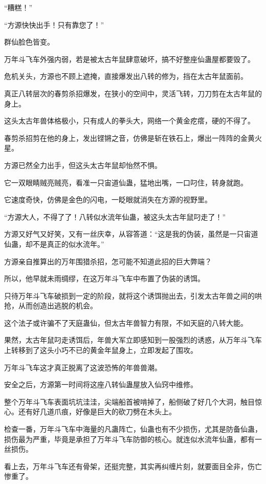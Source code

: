 \begin{this_body}
“糟糕！”

“方源快快出手！只有靠您了！”

群仙脸色皆变。

万年斗飞车外强内弱，若是被太古年鼠肆意破坏，搞不好整座仙蛊屋都要毁了。

危机关头，方源也不顾上遮掩，直接爆发出八转的修为，挡在太古年鼠面前。

真正八转层次的春剪杀招爆发，在狭小的空间中，灵活飞转，刀刀剪在太古年鼠的身上。

这头太古年兽体格极小，只有成人的拳头大，网络一个黄金疙瘩，硬的不得了。

春剪杀招剪在他的身上，发出铿锵之音，仿佛是斩在铁石上，爆出一阵阵的金黄火星。

方源已然全力出手，但这头太古年鼠却怡然不惧。

它一双眼睛贼亮贼亮，看准一只宙道仙蛊，猛地出嘴，一口叼住，转身就跑。

它速度奇快，仿佛是金色的闪电，一眨眼就消失在方源的视野里。

“方源大人，不得了了！八转似水流年仙蛊，被这头太古年鼠叼走了！”

方源又好气又好笑，又有一丝庆幸，从容答道：“这是我的伪装，虽然是一只宙道仙蛊，却不是真正的似水流年。”

方源亲自推算出的万年围猎杀招，怎可能不知道此招的巨大弊端？

所以，他早就未雨绸缪，在这万年斗飞车中布置了伪装的诱饵。

只待万年斗飞车破损到一定的阶段，就将这个诱饵抛出去，引发太古年兽之间的哄抢，从而创造出逃脱的机会。

这个法子或许骗不了天庭蛊仙，但太古年兽智力有限，不如天庭的八转大能。

果然，太古年鼠叼走诱饵后，年兽大军立即感知到一股强烈的诱惑，从万年斗飞车上转移到了这头小巧不已的黄金年鼠身上，立即发起了围攻。

万年斗飞车这才真正脱离了这波恐怖的年兽兽潮。

安全之后，方源第一时间将这座八转仙蛊屋放入仙窍中维修。

整个万年斗飞车表面坑坑洼洼，尖端船首被啃掉了，船侧破了好几个大洞，触目惊心。还有好几道爪痕，好像是巨大的砍刀劈在木头上。

检查一番，万年斗飞车中海量的凡蛊阵亡，仙蛊也有不少损伤，尤其是防备仙蛊，损伤最为严重，毕竟是承担了万年斗飞车防御的核心。就连似水流年仙蛊，都有一丝损伤。

看上去，万年斗飞车还有骨架，还挺完整，其实再纠缠片刻，就要面目全非，伤亡惨重了。


\end{this_body}
